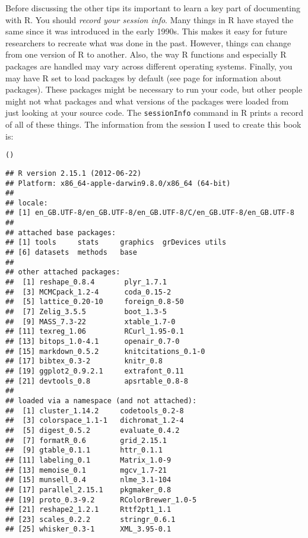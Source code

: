 {Before discussing the other tips its important to learn a key part of documenting with R. You should \emph{record your session info}. Many things in R have stayed the same since it was introduced in the early 1990s. This makes it easy for future researchers to recreate what was done in the past. However, things can change from one version of R to another. Also, the way R functions and especially R packages are handled may vary across different operating systems. Finally, you may have R set to load packages by default (see page \pageref{Packages} for information about packages). These packages might be necessary to run your code, but other people might not what packages and what versions of the packages were loaded from just looking at your source code. The \texttt{sessionInfo} command in R prints a record of all of these things. The information from the session I used to create this book is:

\begin{knitrout}
\color{fgcolor}\begin{kframe}
\begin{alltt}
()
\end{alltt}
\begin{verbatim}
## R version 2.15.1 (2012-06-22)
## Platform: x86_64-apple-darwin9.8.0/x86_64 (64-bit)
## 
## locale:
## [1] en_GB.UTF-8/en_GB.UTF-8/en_GB.UTF-8/C/en_GB.UTF-8/en_GB.UTF-8
## 
## attached base packages:
## [1] tools     stats     graphics  grDevices utils    
## [6] datasets  methods   base     
## 
## other attached packages:
##  [1] reshape_0.8.4       plyr_1.7.1         
##  [3] MCMCpack_1.2-4      coda_0.15-2        
##  [5] lattice_0.20-10     foreign_0.8-50     
##  [7] Zelig_3.5.5         boot_1.3-5         
##  [9] MASS_7.3-22         xtable_1.7-0       
## [11] texreg_1.06         RCurl_1.95-0.1     
## [13] bitops_1.0-4.1      openair_0.7-0      
## [15] markdown_0.5.2      knitcitations_0.1-0
## [17] bibtex_0.3-2        knitr_0.8          
## [19] ggplot2_0.9.2.1     extrafont_0.11     
## [21] devtools_0.8        apsrtable_0.8-8    
## 
## loaded via a namespace (and not attached):
##  [1] cluster_1.14.2     codetools_0.2-8   
##  [3] colorspace_1.1-1   dichromat_1.2-4   
##  [5] digest_0.5.2       evaluate_0.4.2    
##  [7] formatR_0.6        grid_2.15.1       
##  [9] gtable_0.1.1       httr_0.1.1        
## [11] labeling_0.1       Matrix_1.0-9      
## [13] memoise_0.1        mgcv_1.7-21       
## [15] munsell_0.4        nlme_3.1-104      
## [17] parallel_2.15.1    pkgmaker_0.8      
## [19] proto_0.3-9.2      RColorBrewer_1.0-5
## [21] reshape2_1.2.1     Rttf2pt1_1.1      
## [23] scales_0.2.2       stringr_0.6.1     
## [25] whisker_0.3-1      XML_3.95-0.1
\end{verbatim}
\end{kframe}
\end{knitrout}


}
